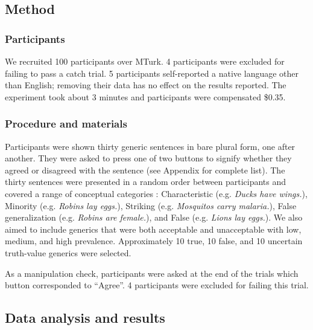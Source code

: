 \documentclass[12pt,letterpaper]{article}
\newcommand{\ndg}[1]{\textcolor{Green}{[ndg: #1]}}
\begin{document}
\subsection*{Method}

\subsubsection*{Participants}

We recruited 100 participants over MTurk. 
4 participants were excluded for failing to pass a catch trial.
5 participants self-reported a native language other than English; removing their data has no effect on the results reported. 
The experiment took about 3 minutes and participants were compensated \$0.35.

\subsubsection*{Procedure and materials}

Participants were shown thirty generic sentences in bare plural form, one after another.
They were asked to press one of two buttons to signify whether they agreed or disagreed with the sentence (see Appendix for complete list). 
The thirty sentences were presented in a random order between participants and covered a range of conceptual categories \cite{Prasada2013}: Characteristic (e.g. \emph{Ducks have wings.}), Minority (e.g. \emph{Robins lay eggs.}), Striking (e.g. \emph{Mosquitos carry malaria.}), False generalization (e.g. \emph{Robins are female.}), and False (e.g. \emph{Lions lay eggs.}).
We also aimed to include generics that were both acceptable and unacceptable with low, medium, and high prevalence.
Approximately 10 true, 10 false, and 10 uncertain truth-value generics were selected.

As a manipulation check, participants were asked at the end of the trials which button corresponded to ``Agree''.
4 participants were excluded for failing this trial.

\subsection*{Data analysis and results}
 
\end{document}
